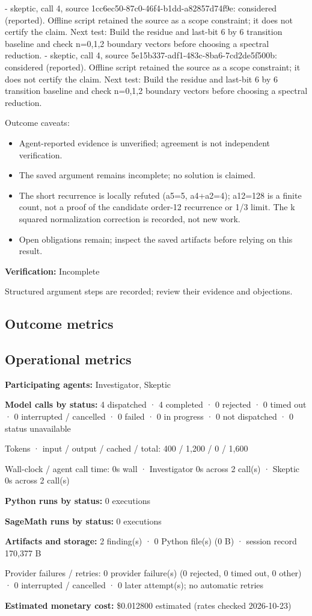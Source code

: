 \documentclass[11pt]{article}
\begin{document}
- skeptic, call 4, source 1cc6ec50-87c0-46f4-b1dd-a82857d74f9e: considered (reported). Offline script retained the source as a scope constraint; it does not certify the claim. Next test: Build the residue and last-bit 6 by 6 transition baseline and check n=0,1,2 boundary vectors before choosing a spectral reduction.
- skeptic, call 4, source 5e15b337-adf1-483c-8ba6-7cd2de5f500b: considered (reported). Offline script retained the source as a scope constraint; it does not certify the claim. Next test: Build the residue and last-bit 6 by 6 transition baseline and check n=0,1,2 boundary vectors before choosing a spectral reduction.\par
Outcome caveats:\par
\begin{itemize}
\item Agent-reported evidence is unverified; agreement is not independent verification.
\item The saved argument remains incomplete; no solution is claimed.
\item The short recurrence is locally refuted (a5=5, a4+a2=4); a12=128 is a finite count, not a proof of the candidate order-12 recurrence or 1/3 limit. The k squared normalization correction is recorded, not new work.
\item Open obligations remain; inspect the saved artifacts before relying on this result.
\end{itemize}
\textbf{Verification:} Incomplete\par
Structured argument steps are recorded; review their evidence and objections.\par
\subsection{Outcome metrics}
\subsection{Operational metrics}
\textbf{Participating agents:} Investigator, Skeptic\par
\textbf{Model calls by status:} 4 dispatched · 4 completed · 0 rejected · 0 timed out · 0 interrupted / cancelled · 0 failed · 0 in progress · 0 not dispatched · 0 status unavailable\par
Tokens · input / output / cached / total: 400 / 1,200 / 0 / 1,600\par
Wall-clock / agent call time: 0s wall · Investigator 0s across 2 call(s) · Skeptic 0s across 2 call(s)\par
\textbf{Python runs by status:} 0 executions\par
\textbf{SageMath runs by status:} 0 executions\par
\textbf{Artifacts and storage:} 2 finding(s) · 0 Python file(s) (0 B) · session record 170,377 B\par
Provider failures / retries: 0 provider failure(s) (0 rejected, 0 timed out, 0 other) · 0 interrupted / cancelled · 0 later attempt(s); no automatic retries\par
\textbf{Estimated monetary cost:} \$0.012800 estimated (rates checked 2026-10-23)\par
\end{document}
